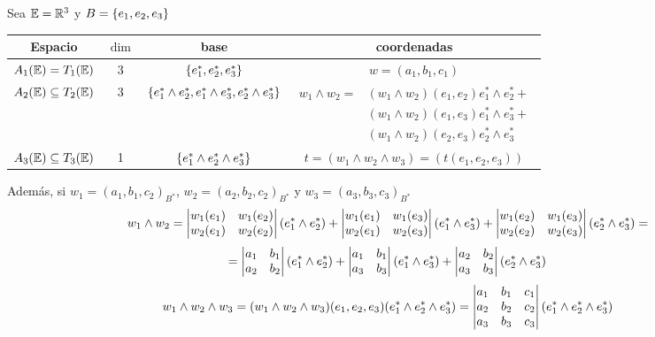 \begin{example}
    Sea $\mathbb{E}=\mathbb{R}^3$ y $B = \left\{e_1,e_2,e_3\right\}$
    \begin{center}
        \begin{tabular}{|c|c|c|c|}
            \hline
            Espacio & $\dim$ & base & coordenadas \\
            \hline \hline
            $A_1(\mathbb{E})= T_1(\mathbb{E})$ & 3 & $\left\{e_1^*,e_2^*,e_3^*\right\}$ &
            $w = (a_1,b_1,c_1)$ \\ \hline $A_2(\mathbb{E}) \subseteq T_2(\mathbb{E})$ & 3 &
            $\left\{e_1^* \wedge e_2^*, e_1^* \wedge e_3^*, e_2^* \wedge e_3^*\right\}$ &
            $\begin{aligned}
                w_1 \wedge w_2 =& (w_1 \wedge w_2)(e_1,e_2) e_1^* \wedge e_2^* + \\
                 & (w_1 \wedge w_2)(e_1,e_3) e_1^* \wedge e_3^* + \\
                 & (w_1 \wedge w_2)(e_2,e_3) e_2^* \wedge e_3^*
            \end{aligned}$ \\
            \hline $A_3(\mathbb{E}) \subseteq T_3(\mathbb{E})$ & 1 &
            $\left\{e_1^* \wedge e_2^* \wedge e_3^*\right\}$ &
            $t =(w_1 \wedge w_2 \wedge w_3) = (t(e_1,e_2,e_3))$ \\ \hline
        \end{tabular}
    \end{center}
    Además, si $w_1=(a_1,b_1,c_2)_{B^*}$, $w_2=(a_2,b_2,c_2)_{B^*}$ y
    $w_3=(a_3,b_3,c_3)_{B^*}$
    \[
        w_1 \wedge w_2 = \begin{vmatrix}w_1(e_1) & w_1(e_2) \\ w_2(e_1) & w_2(e_2)\end{vmatrix}
        (e_1^* \wedge e_2^*) + \begin{vmatrix}w_1(e_1) & w_1(e_3) \\ w_2(e_1) & w_2(e_3)\end{vmatrix}
        (e_1^* \wedge e_3^*) + \begin{vmatrix}w_1(e_2) & w_1(e_3) \\ w_2(e_2) & w_2(e_3)\end{vmatrix}
        (e_2^* \wedge e_3^*) =
    \]
    \[
        = \begin{vmatrix}a_1 & b_1 \\ a_2 & b_2\end{vmatrix}(e_1^* \wedge e_2^*) +
        \begin{vmatrix}a_1 & b_1 \\ a_3 & b_3\end{vmatrix}(e_1^* \wedge e_3^*)
        + \begin{vmatrix}a_2 & b_2 \\ a_3 & b_3\end{vmatrix}(e_2^* \wedge e_3^*)
    \]
    \[
        w_1 \wedge w_2 \wedge w_3 = (w_1 \wedge w_2 \wedge w_3)    (e_1,e_2,e_3)
        (e_1^* \wedge e_2^* \wedge e_3^*) =
        \begin{vmatrix}a_1 & b_1 & c_1 \\ a_2 & b_2 & c_2 \\ a_3 & b_3 & c_3\end{vmatrix}
        (e_1^* \wedge e_2^* \wedge e_3^*)
    \]
\end{example}

